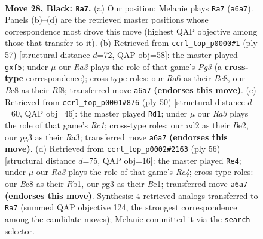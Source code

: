 \documentclass[11pt]{article}
\begin{document}
\clearpage

\begin{figure}[p]\centering
\begin{subfigure}{0.46\textwidth}\centering
\resizebox{\linewidth}{!}{%
\newchessgame
\chessboard[
  setfen={1qb5/5pkp/rp3np1/6N1/Pp6/1P4P1/3NRPBP/R5K1 b - - 7 28},
  showmover=false,
  pgfstyle=straightmove, color=movearrow, markmove={a6-a7}
]}
\caption{}
\end{subfigure}\hfill
\begin{subfigure}{0.46\textwidth}\centering
\resizebox{\linewidth}{!}{%
\newchessgame
\chessboard[
  setfen={2b2r2/1p2r1k1/p1p2npp/2N2P2/7P/1P3PPB/P2R1K2/2R5 b - - 4 29},
  showmover=false,
  pgfstyle=straightmove, color=movearrow, markmove={g6-f5}
]}
\caption{}
\end{subfigure}
\\[4pt]
\begin{subfigure}{0.46\textwidth}\centering
\resizebox{\linewidth}{!}{%
\newchessgame
\chessboard[
  setfen={r1b1rk2/1p3pp1/2p4p/p7/Pn1N3P/R3PP2/1P2BKP1/2R5 w - - 9 26},
  showmover=false,
  pgfstyle=straightmove, color=movearrow, markmove={c1-d1}
]}
\caption{}
\end{subfigure}\hfill
\begin{subfigure}{0.46\textwidth}\centering
\resizebox{\linewidth}{!}{%
\newchessgame
\chessboard[
  setfen={2r5/pr3pk1/1n3bpp/2p5/P1R5/1P3NP1/5PKP/1R2B3 w - - 6 29},
  showmover=false,
  pgfstyle=straightmove, color=movearrow, markmove={c4-e4}
]}
\caption{}
\end{subfigure}
\caption{\textbf{Move 28, Black: \texttt{Ra7}.} (a) Our position; Melanie plays \texttt{Ra7} (\texttt{a6a7}). Panels (b)--(d) are the retrieved master positions whose correspondence most drove this move (highest QAP objective among those that transfer to it). (b) Retrieved from \texttt{ccrl\_top\_p0000\#1} (ply 57) [structural distance $d$=72, QAP obj=58]: the master played \texttt{gxf5}; under $\mu$ our \emph{Ra3} plays the role of that game's \emph{Pg3} (a \textbf{cross-type} correspondence); cross-type roles: our \emph{R}a6 as their \emph{B}c8, our \emph{B}c8 as their \emph{R}f8; transferred move \texttt{a6a7} \textbf{(endorses this move)}. (c) Retrieved from \texttt{ccrl\_top\_p0001\#876} (ply 50) [structural distance $d$=60, QAP obj=46]: the master played \texttt{Rd1}; under $\mu$ our \emph{Ra3} plays the role of that game's \emph{Rc1}; cross-type roles: our \emph{n}d2 as their \emph{B}e2, our \emph{p}g3 as their \emph{R}a3; transferred move \texttt{a6a7} \textbf{(endorses this move)}. (d) Retrieved from \texttt{ccrl\_top\_p0002\#2163} (ply 56) [structural distance $d$=75, QAP obj=16]: the master played \texttt{Re4}; under $\mu$ our \emph{Ra3} plays the role of that game's \emph{Rc4}; cross-type roles: our \emph{B}c8 as their \emph{R}b1, our \emph{p}g3 as their \emph{B}e1; transferred move \texttt{a6a7} \textbf{(endorses this move)}. Synthesis: 4 retrieved analogs transferred to \texttt{Ra7} (summed QAP objective 124, the strongest correspondence among the candidate moves); Melanie committed it via the \texttt{search} selector.}
\label{fig:thought-m55}
\end{figure}
\end{document}
